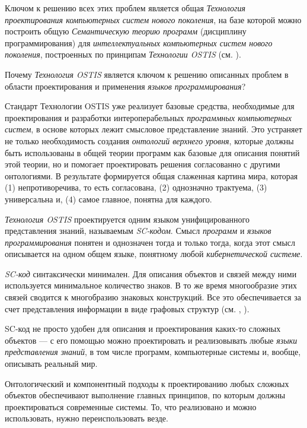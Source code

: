 Ключом к решению всех этих проблем является общая \textit{Технология проектирования компьютерных систем нового поколения}, на базе которой можно построить общую \textit{Семантическую теорию программ} (дисциплину программирования) для \textit{интеллектуальных компьютерных систем нового поколения}, построенных по принципам \textit{Технологии OSTIS} (см. ).

Почему \textit{Технология OSTIS} является ключом к решению описанных проблем в области проектирования и применения \textit{языков программирования}?
\begin{textitemize}
    \item Стандарт Технологии OSTIS  уже реализует базовые средства, необходимые для проектирования и разработки интероперабельных \textit{программных компьютерных систем}, в основе которых лежит смысловое представление знаний. Это устраняет не только необходимость создания \textit{онтологий верхнего уровня}, которые должны быть использованы в общей теории программ как базовые для описания понятий этой теории, но и помогает проектировать решения согласованно с другими онтологиями. В результате формируется общая слаженная картина мира, которая (1) непротиворечива, то есть согласована, (2) однозначно трактуема, (3) универсальна и, (4) самое главное, понятна для каждого.
    \item \textit{Технология OSTIS} проектируется одним языком унифицированного представления знаний, называемым \textit{SC-кодом}. Смысл \textit{программ} и \textit{языков программирования} понятен и однозначен тогда и только тогда, когда этот смысл описывается на одном общем языке, понятному любой \textit{кибернетической системе}.
    \item \textit{SC-код} синтаксически минимален. Для описания объектов и связей между ними используется минимальное количество знаков. В то же время многообразие этих связей сводится к многобразию знаковых конструкций. Все это обеспечивается за счет представления информации в виде графовых структур (см. , ).
    \item SC-код не просто удобен для описания и проектирования каких-то сложных объектов --- с его помощью можно проектировать и реализовывать любые \textit{языки представления знаний}, в том числе программ, компьютерные системы и, вообще, описывать реальный мир.
    \item Онтологический и компонентный подходы к проектированию любых сложных объектов обеспечивают выполнение главных принципов, по которым должны проектироваться современные системы. То, что реализовано и можно использовать, нужно переиспользовать везде.
\end{textitemize}

